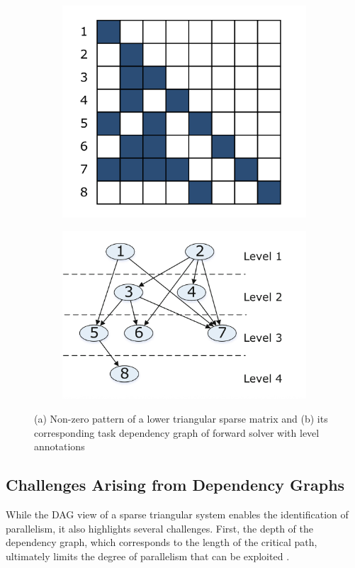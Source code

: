 \begin{figure}
\centering
\begin{subfigure}{.5\textwidth}
  \centering
  \includegraphics[width=.8\linewidth]{report/figures/lr_2_2_ex_1.png}
  \caption{}
\end{subfigure}%
\begin{subfigure}{.5\textwidth}
  \centering
  \includegraphics[width=.8\linewidth]{report/figures/lr_2_2_ex_2.png}
  \caption{}
\end{subfigure}
\caption{(a) Non-zero pattern of a lower
triangular sparse matrix and (b) its corresponding task dependency graph of forward solver with level annotations \cite{10.1007/978-3-319-07518-1_8}}
\label{fig:example_lr_2_2}
\end{figure}

\subsection{Challenges Arising from Dependency Graphs}
While the DAG view of a sparse triangular system enables the identification of parallelism, it also highlights several challenges. First, the depth of the dependency graph, which corresponds to the length of the critical path, ultimately limits the degree of parallelism that can be exploited \cite{10.1007/978-3-319-07518-1_8}. 


